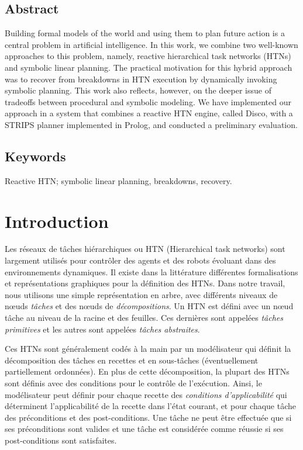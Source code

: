 \documentclass[a4paper,twoside,french]{article}
\begin{document}
				\subsection*{Abstract}
				Building formal models of the world and using them to plan future
				action is a central problem in artificial intelligence.  In this
				work, we combine two well-known approaches to this problem, namely,
				reactive hierarchical task networks (HTNs) and symbolic linear
				planning.  The practical motivation for this hybrid approach was to
				recover from breakdowns in HTN execution by dynamically invoking
				symbolic planning.  This work also reflects, however, on the deeper
				issue of tradeoffs between procedural and symbolic modeling.  We
				have implemented our approach in a system that combines a reactive
				HTN engine, called Disco, with a STRIPS planner implemented in
				Prolog, and conducted a preliminary evaluation.
				\subsection*{Keywords}
				Reactive HTN; symbolic linear planning, breakdowns, recovery.
				
				
		\section{Introduction}
		Les r\'eseaux de t\^aches hi\'erarchiques ou HTN \cite{erol1994htn} (Hierarchical task networks) sont largement utilis\'es pour contr\^oler des agents et des robots \'evoluant dans des environnements dynamiques. Il existe dans la litt\'erature diff\'erentes formalisations et repr\'esentations graphiques pour la d\'efinition des HTNs. Dans notre travail, nous utilisons une simple repr\'esentation en arbre, avec  différents niveaux de  n\oe uds {\em tâches}  et des  n\oe uds de {\em décompositions}. Un HTN est défini avec un n\oe ud tâche au niveau de la racine et des feuilles. Ces dernières sont appelées {\em tâches primitives} et les autres sont appelées {\em tâches abstraites}. 

		\par Ces HTNs sont g\'en\'eralement cod\'es \`a la main par un modélisateur qui définit la décomposition des tâches en recettes et en sous-tâches (éventuellement partiellement ordonn\'ees). En plus de cette d\'ecomposition, la plupart des HTNs sont d\'efinis avec des conditions pour le contrôle de l'exécution. Ainsi, le modélisateur peut définir pour chaque recette des \emph{conditions d'applicabilité} qui déterminent l'applicabilité de la recette dans l'état courant, et pour chaque tâche des pr\'econditions et des post-conditions. Une tâche ne peut être effectuée que si ses préconditions sont valides et une tâche est considérée comme réussie si ses post-conditions sont satisfaites.
						
\end{document}
